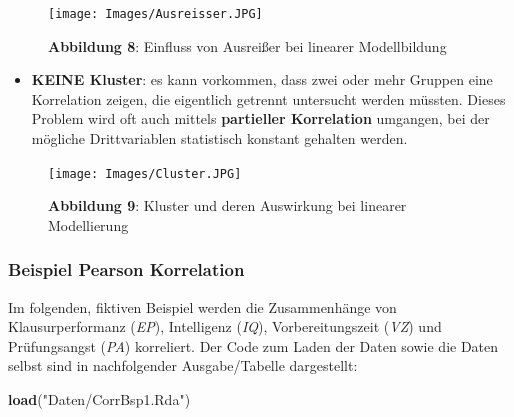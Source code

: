 \documentclass[]{article}
\newenvironment{Shaded}{\begin{snugshade}}{\end{snugshade}}
\newcommand{\KeywordTok}[1]{\textcolor[rgb]{0.13,0.29,0.53}{\textbf{#1}}}
\newcommand{\NormalTok}[1]{#1}
\newcommand{\StringTok}[1]{\textcolor[rgb]{0.31,0.60,0.02}{#1}}
\providecommand{\tightlist}{%
  \setlength{\itemsep}{0pt}\setlength{\parskip}{0pt}}
\begin{document}
\begin{figure}
\centering
\texttt{[image: Images/Ausreisser.JPG]}
\caption{\textbf{Abbildung 8}: Einfluss von Ausreißer bei linearer Modellbildung}
\end{figure}

\begin{itemize}
\tightlist
\item
  \textbf{KEINE Kluster}: es kann vorkommen, dass zwei oder mehr Gruppen eine Korrelation zeigen, die eigentlich getrennt untersucht werden müssten. Dieses Problem wird oft auch mittels \textbf{partieller Korrelation} umgangen, bei der mögliche Drittvariablen statistisch konstant gehalten werden.
\end{itemize}

\begin{figure}
\centering
\texttt{[image: Images/Cluster.JPG]}
\caption{\textbf{Abbildung 9}: Kluster und deren Auswirkung bei linearer Modellierung}
\end{figure}

\hypertarget{beispiel-pearson-korrelation}{%
\subsubsection*{Beispiel Pearson Korrelation}\label{beispiel-pearson-korrelation}}

Im folgenden, fiktiven Beispiel werden die Zusammenhänge von Klausurperformanz (\emph{EP}), Intelligenz (\emph{IQ}), Vorbereitungszeit (\emph{VZ}) und Prüfungsangst (\emph{PA}) korreliert. Der Code zum Laden der Daten sowie die Daten selbst sind in nachfolgender Ausgabe/Tabelle dargestellt:

\begin{Shaded}
\begin{Highlighting}[]
    \KeywordTok{load}\NormalTok{(}\StringTok{"Daten/CorrBsp1.Rda"}\NormalTok{)}
\end{Highlighting}
\end{Shaded}
\end{document}
